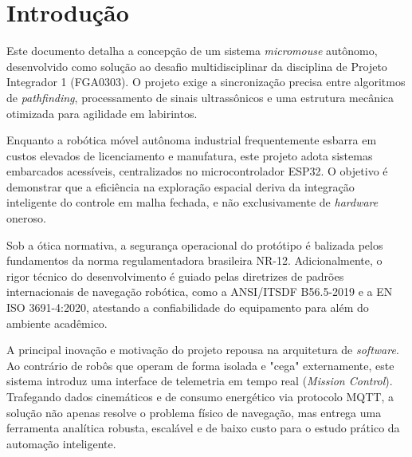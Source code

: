 \chapter{Introdução}
\vspace{-1cm} %

Este documento detalha a concepção de um sistema \textit{micromouse} autônomo, desenvolvido como solução ao desafio multidisciplinar da disciplina de Projeto Integrador 1 (FGA0303). O projeto exige a sincronização precisa entre algoritmos de \textit{pathfinding}, processamento de sinais ultrassônicos e uma estrutura mecânica otimizada para agilidade em labirintos.

Enquanto a robótica móvel autônoma industrial frequentemente esbarra em custos elevados de licenciamento e manufatura, este projeto adota sistemas embarcados acessíveis, centralizados no microcontrolador ESP32. O objetivo é demonstrar que a eficiência na exploração espacial deriva da integração inteligente do controle em malha fechada, e não exclusivamente de \textit{hardware} oneroso.

Sob a ótica normativa, a segurança operacional do protótipo é balizada pelos fundamentos da norma regulamentadora brasileira NR-12. Adicionalmente, o rigor técnico do desenvolvimento é guiado pelas diretrizes de padrões internacionais de navegação robótica, como a ANSI/ITSDF B56.5-2019 e a EN ISO 3691-4:2020, atestando a confiabilidade do equipamento para além do ambiente acadêmico.

A principal inovação e motivação do projeto repousa na arquitetura de \textit{software}. Ao contrário de robôs que operam de forma isolada e "cega" externamente, este sistema introduz uma interface de telemetria em tempo real (\textit{Mission Control}). Trafegando dados cinemáticos e de consumo energético via protocolo MQTT, a solução não apenas resolve o problema físico de navegação, mas entrega uma ferramenta analítica robusta, escalável e de baixo custo para o estudo prático da automação inteligente.